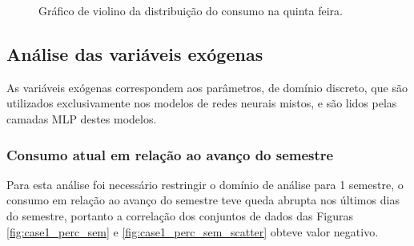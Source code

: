 {\begin{center}
\begin{minipage}[c]{0.45\textwidth}
\begin{figure}[H]
{                	\caption{Gráfico de violino da distribuição do consumo na quinta feira.} \label{fig:case1_violinplot_quinta} }
                \end{figure}\end{minipage} %
                        \begin{minipage}[c]{0.45\textwidth}
                \begin{figure}[H]
                \end{figure}
                \end{minipage} \end{center} }
    \subsection{Análise das variáveis exógenas}
        As variáveis exógenas correspondem aos parâmetros, de domínio discreto, que são utilizados exclusivamente nos modelos de redes neurais mistos, e são lidos pelas camadas MLP destes modelos.
        
        \subsubsection{Consumo atual em relação ao avanço do semestre}
        
        Para esta análise foi necessário restringir o domínio de análise para 1 semestre, o consumo em relação ao avanço do semestre teve queda abrupta nos últimos dias do semestre, portanto a correlação dos conjuntos de dados das Figuras \ref{fig:case1_perc_sem} e \ref{fig:case1_perc_sem_scatter} obteve valor negativo.
        

